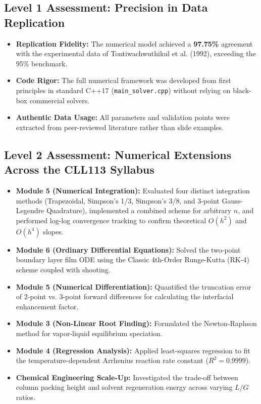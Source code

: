 \documentclass[11pt,a4paper]{article}
\begin{document}
\subsection{Level 1 Assessment: Precision in Data Replication}
\begin{itemize}
    \item \textbf{Replication Fidelity:} The numerical model achieved a \textbf{97.75\%} agreement with the experimental data of Tontiwachwuthikul et al. (1992), exceeding the 95\% benchmark.
    \item \textbf{Code Rigor:} The full numerical framework was developed from first principles in standard C++17 (\texttt{main\_solver.cpp}) without relying on black-box commercial solvers.
    \item \textbf{Authentic Data Usage:} All parameters and validation points were extracted from peer-reviewed literature rather than slide examples.
\end{itemize}

\subsection{Level 2 Assessment: Numerical Extensions Across the CLL113 Syllabus}
\begin{itemize}
    \item \textbf{Module 5 (Numerical Integration):} Evaluated four distinct integration methods (Trapezoidal, Simpson's 1/3, Simpson's 3/8, and 3-point Gauss-Legendre Quadrature), implemented a combined scheme for arbitrary $n$, and performed log-log convergence tracking to confirm theoretical $O(h^2)$ and $O(h^4)$ slopes.
    \item \textbf{Module 6 (Ordinary Differential Equations):} Solved the two-point boundary layer film ODE using the Classic 4th-Order Runge-Kutta (RK-4) scheme coupled with shooting.
    \item \textbf{Module 5 (Numerical Differentiation):} Quantified the truncation error of 2-point vs. 3-point forward differences for calculating the interfacial enhancement factor.
    \item \textbf{Module 3 (Non-Linear Root Finding):} Formulated the Newton-Raphson method for vapor-liquid equilibrium speciation.
    \item \textbf{Module 4 (Regression Analysis):} Applied least-squares regression to fit the temperature-dependent Arrhenius reaction rate constant ($R^2 = 0.9999$).
    \item \textbf{Chemical Engineering Scale-Up:} Investigated the trade-off between column packing height and solvent regeneration energy across varying $L/G$ ratios.
\end{itemize}



\end{document}
